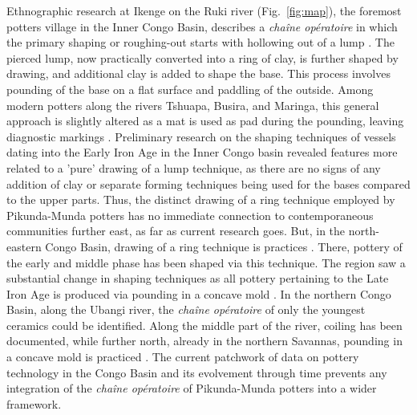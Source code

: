 \documentclass[smallextended,natbib]{svjour3}       %
\begin{document}
Ethnographic research at Ikenge on the Ruki river (Fig.~\ref{fig:map}), the foremost potters village in the Inner Congo Basin, describes a \textit{chaîne opératoire} in which the primary shaping or roughing-out starts with hollowing out of a lump \citep{Eggert.1980c}. The pierced lump, now practically converted into a ring of clay, is further shaped by drawing, and additional clay is added to shape the base. This process involves pounding of the base on a flat surface and paddling of the outside. Among modern potters along the rivers Tshuapa, Busira, and Maringa, this general approach is slightly altered as a mat is used as pad during the pounding, leaving diagnostic markings \citep[188,196--197]{Wotzka.1995}. Preliminary research on the shaping techniques of vessels dating into the Early Iron Age in the Inner Congo basin revealed features more related to a 'pure' drawing of a lump technique, as there are no signs of any addition of clay or separate forming techniques being used for the bases compared to the upper parts. Thus, the distinct drawing of a ring technique employed by Pikunda-Munda potters has no immediate connection to contemporaneous communities further east, as far as current research goes. But, in the north-eastern Congo Basin, drawing of a ring technique is practices \citep[110,115]{LivingstoneSmith.2017}. There, pottery of the early and middle phase has been shaped via this technique. The region saw a substantial change in shaping techniques as all pottery pertaining to the Late Iron Age is produced via pounding in a concave mold \citep[111,115]{LivingstoneSmith.2017}. In the northern Congo Basin, along the Ubangi river, the \textit{chaîne opératoire} of only the youngest ceramics could be identified. Along the middle part of the river, coiling has been documented, while further north, already in the northern Savannas, pounding in a concave mold is practiced \citep[55--60 Fig.~19--20,73]{Seidensticker.2021e}. The current patchwork of data on pottery technology in the Congo Basin and its evolvement through time prevents any integration of the \textit{chaîne opératoire} of Pikunda-Munda potters into a wider framework.

\end{document}
